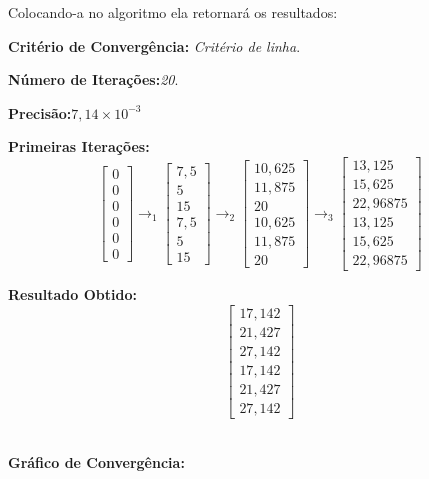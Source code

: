 \documentclass[
12pt,				%
openright,			%
twoside,			%
a4paper,			%
english,			%
french,				%
spanish,			%
brazil				%
]{abntex2_new}
\begin{document}
		Colocando-a no algoritmo ela retornará os resultados:
		
		\begin{alineas}
			\item{\textbf{Critério de Convergência:} \textit{Critério de linha}.}
			\item{\textbf{Número de Iterações:}\textit{20}.}
			\item{\textbf{Precisão:}\textit{$7,14 \times 10^{-3}$}}
			\item{\textbf{Primeiras Iterações:}\\
				$$	\begin{bmatrix}
				0\\
				0\\
				0\\
				0\\
				0\\
				0
				\end{bmatrix} \rightarrow_1
				\begin{bmatrix}
				7,5\\
				5\\
				15\\
				7,5\\
				5\\
				15
				\end{bmatrix} \rightarrow_2
				\begin{bmatrix}
				10,625\\
				11,875\\
				20\\
				10,625\\
				11,875\\
				20
				\end{bmatrix} \rightarrow_3
				\begin{bmatrix}
				13,125\\
				15,625\\
				22,96875\\
				13,125\\
				15,625\\
				22,96875
				\end{bmatrix}$$
			}
			\item{\textbf{Resultado Obtido:}}\\
			$$\begin{bmatrix}
			17,142\\
			21,427\\
			27,142\\
			17,142\\
			21,427\\
			27,142
			\end{bmatrix}$$\\
			\clearpage
			\item{\textbf{Gráfico de Convergência:}}
			

\end{alineas}
\end{document}
